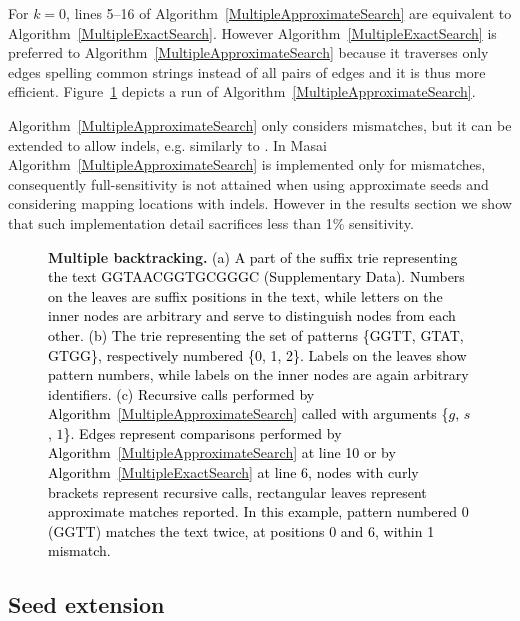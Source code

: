 \documentclass[a4,center,fleqn]{article}
\newcommand{\eg}{{e.g.}\xspace}
\begin{document}
For $k=0$, lines 5--16 of Algorithm~\ref{MultipleApproximateSearch} are equivalent to Algorithm~\ref{MultipleExactSearch}.
However Algorithm~\ref{MultipleExactSearch} is preferred to Algorithm~\ref{MultipleApproximateSearch} because it traverses only edges spelling common strings instead of all pairs of edges and it is thus more efficient.
Figure~\ref{fig:MSA} depicts a run of Algorithm~\ref{MultipleApproximateSearch}.

Algorithm~\ref{MultipleApproximateSearch} only considers mismatches, but it can be extended to allow indels, \eg similarly to \cite{Navarro2000}.
In Masai Algorithm~\ref{MultipleApproximateSearch} is implemented only for mismatches, consequently full-sensitivity is not attained when using approximate seeds and considering mapping locations with indels.
However in the results section we show that such implementation detail sacrifices less than 1\% sensitivity.

\begin{figure}[h]
\centering
\vspace{5mm}
\hspace{10mm}
\hspace{10mm}
\caption{
{\bfseries Multiple backtracking.}
\textcolor{black}
{
(a) A part of the suffix trie representing the text GGTAACGGTGCGGGC (Supplementary Data). Numbers on the leaves are suffix positions in the text, while letters on the inner nodes are arbitrary and serve to distinguish nodes from each other.
(b) The trie representing the set of patterns \{GGTT, GTAT, GTGG\}, respectively numbered \{0, 1, 2\}. Labels on the leaves show pattern numbers, while labels on the inner nodes are again arbitrary identifiers.
(c) Recursive calls performed by Algorithm~\ref{MultipleApproximateSearch} called with arguments \{$g$, $s$, $1$\}. Edges represent comparisons performed by Algorithm~\ref{MultipleApproximateSearch} at line 10 or by Algorithm~\ref{MultipleExactSearch} at line 6, nodes with curly brackets represent recursive calls, rectangular leaves represent approximate matches reported.
In this example, pattern numbered 0 (GGTT) matches the text twice, at positions 0 and 6, within 1 mismatch.}
}

\label{fig:MSA}
\end{figure}

\subsection{Seed extension}
\end{document}
